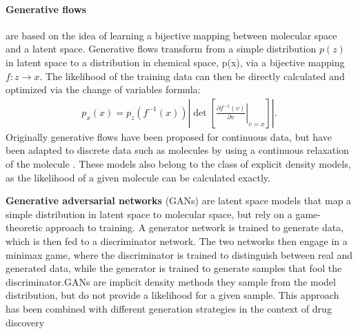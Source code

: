 \paragraph{Generative flows} \citep{rezendeVariationalInferenceNormalizing2016} are based on the idea of learning a bijective mapping between molecular
space and a latent space. Generative flows transform from a simple distribution $p(z)$ in latent space
to a distribution in chemical space, p(x), via a bijective mapping $f: z \rightarrow x$.
The likelihood of the training data can then be directly calculated and optimized
via the change of variables formula:
\begin{align}
      p_x(x) = p_z(f^{-1}(x)) \left|
      \det \left[
      \left. \frac{\partial f^{-1}(v)}{\partial v} \right|_{v=x}
      \right]
      \right|.
\end{align}
Originally generative flows have been proposed for continuous data, but have been adapted to
discrete data such as molecules by using a continuous relaxation of the molecule
\citep{madhawaGraphNVPInvertibleFlow2019}. These models also belong to the class of explicit density
models, as the likelihood of a given molecule can be calculated exactly.

\textbf{Generative adversarial networks} (GANs) \citep{goodfellowGenerativeAdversarialNetworks2014}
are latent space models that map a simple distribution in latent space to molecular space, but rely
on a game-theoretic approach to training. A generator network is trained to generate data, which is
then fed to a discriminator network. The two networks then engage in a minimax game, where the
discriminator is trained to distinguish between real and generated data, while the generator
is trained to generate samples that fool the discriminator.\@ \acp{GAN} are implicit density methods they sample from the
model distribution, but do not provide a likelihood for a given sample. This approach has been
combined with different generation strategies in the context of drug discovery \citep{decaoMolGANImplicitGenerative2018,kadurinDruGANAdvancedGenerative2017,guimaraesObjectiveReinforcedGenerativeAdversarial2017,mendez-lucioNovoGenerationHitlike2018,tangMolecularGenerativeAdversarial2024}

